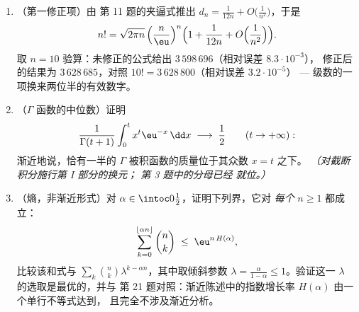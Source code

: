\begin{problem}
\begin{enumerate}[resume]
        证明 $s_{d-1} \to 0$ 同样快于任何几何速率 ---
        高维球面按任一欧几里得度量都是
        极其微小的。
  \item （第一修正项）由
        第 11 题的夹逼式推出 $d_n = \frac1{12n} +
        O\bigl(\frac1{n^2}\bigr)$，于是
        \[
        n! = \sqrt{2\pi n}\,\Bigl(\frac
        n\eu\Bigr)^{n}\Bigl(1 + \frac1{12n} +
        O\Bigl(\frac1{n^2}\Bigr)\Bigr).
        \]
        取 $n = 10$ 验算：未修正的公式给出
        $3\,598\,696$（相对误差 $8.3\cdot10^{-3}$），
        修正后的结果为 $3\,628\,685$，对照 $10! =
        3\,628\,800$（相对误差 $3.2\cdot10^{-5}$） ---
        级数的一项换来两位半的有效数字。
  \item （$\Gamma$ 函数的中位数）证明
        \[
        \frac{1}{\Gamma(t+1)}
        \int_0^{t} x^{t}\eu^{-x}\,\dd x
        \;\longrightarrow\; \frac12
        \qquad (t \to +\infty) :
        \]
        渐近地说，恰有一半的
        $\Gamma$ 被积函数的质量位于其众数 $x = t$ 之下。
        \emph{（对截断积分施行第 I 部分的换元；
        第 3 题中的分母已经
        就位。）}
  \item （熵，非渐近形式）对 $\alpha \in
        \intoc0{\frac12}$，证明下列界，它对
        \emph{每个} $n \geq 1$ 都成立：
        \[
        \sum_{k=0}^{\lfloor\alpha n\rfloor}\binom nk
        \;\leq\; \eu^{n\,H(\alpha)} ,
        \]
        比较该和式与 $\sum_k\binom
        nk\lambda^{k-\alpha n}$，其中取倾斜参数 $\lambda =
        \frac{\alpha}{1-\alpha} \leq 1$。验证这一
        $\lambda$ 的选取是最优的，并与
        第 21 题对照：渐近陈述中的指数增长率 $H(\alpha)$
        由一个单行不等式达到，
        且完全不涉及渐近分析。
\end{enumerate}
\end{problem}
